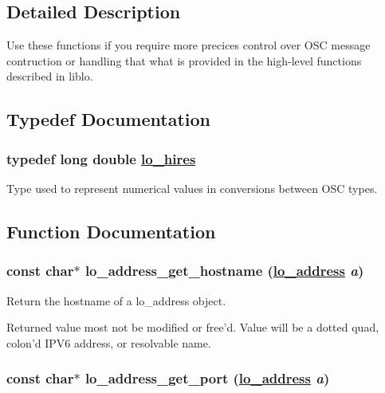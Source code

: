 \subsection{Detailed Description}
Use these functions if you require more precices control over OSC message contruction or handling that what is provided in the high-level functions described in liblo. 

\subsection{Typedef Documentation}
\hypertarget{group__liblolowlevel_g0062385786b0375d4b6954ba1fb8d52b}{
\subsubsection[lo\_\-hires]{\setlength{\rightskip}{0pt plus 5cm}typedef long double \hyperlink{group__liblolowlevel_g0062385786b0375d4b6954ba1fb8d52b}{lo\_\-hires}}}
\label{group__liblolowlevel_g0062385786b0375d4b6954ba1fb8d52b}


Type used to represent numerical values in conversions between OSC types. 



\subsection{Function Documentation}
\hypertarget{group__liblolowlevel_g7dbaa4a6dfc9d7369cfbca195809be3c}{
\subsubsection[lo\_\-address\_\-get\_\-hostname]{\setlength{\rightskip}{0pt plus 5cm}const char$\ast$ lo\_\-address\_\-get\_\-hostname (\hyperlink{lo__types_8h_bf9b53223467de596b89e1377b0f3f3d}{lo\_\-address} {\em a})}}
\label{group__liblolowlevel_g7dbaa4a6dfc9d7369cfbca195809be3c}


Return the hostname of a lo\_\-address object. 

Returned value most not be modified or free'd. Value will be a dotted quad, colon'd IPV6 address, or resolvable name. \hypertarget{group__liblolowlevel_g75bc15ab78de049c0e0d7e24a0d6d0c1}{
\subsubsection[lo\_\-address\_\-get\_\-port]{\setlength{\rightskip}{0pt plus 5cm}const char$\ast$ lo\_\-address\_\-get\_\-port (\hyperlink{lo__types_8h_bf9b53223467de596b89e1377b0f3f3d}{lo\_\-address} {\em a})}}
\label{group__liblolowlevel_g75bc15ab78de049c0e0d7e24a0d6d0c1}


